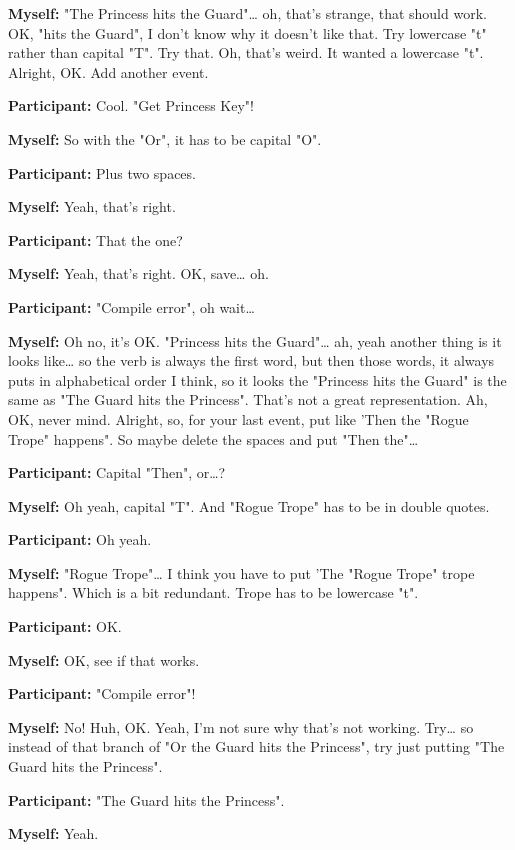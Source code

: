 \documentclass[11pt]{report}
\newcommand{\llabel}[1]{\hypertarget{llineno:#1}{\linelabel{#1}}}
\begin{document}
\begin{linenumbers}
\textbf{Myself:} "The Princess hits the Guard"\ldots{} oh, that's strange, that should work. OK, "hits the Guard", I don't know why it doesn't like that. Try lowercase "t" rather than capital "T". Try that. Oh, that's weird. It wanted a lowercase "t". Alright, OK. Add another event.

\textbf{Participant:} Cool. "Get Princess Key"!

\textbf{Myself:} So with the "Or", it has to be capital "O".

\textbf{Participant:} Plus two spaces.

\textbf{Myself:} Yeah, that's right.

\textbf{Participant:} That the one?

\textbf{Myself:} Yeah, that's right. OK, save\ldots{} oh.

\textbf{Participant:} "Compile error", oh wait\ldots{}

\textbf{Myself:} Oh no, it's OK. "Princess hits the Guard"\ldots{} ah, yeah another thing is it looks like\ldots{} so the verb is always the first word, but then those words, it always puts in alphabetical order I think, so it looks the "Princess hits the Guard" is the same as "The Guard hits the Princess". That's not a great representation. Ah, OK, never mind. Alright, so, for your last event, put like 'Then the "Rogue Trope" happens". So maybe delete the spaces and put "Then the"\ldots{}

\textbf{Participant:} Capital "Then", or\ldots{}?\llabel{lne:syntax5c4}

\textbf{Myself:} Oh yeah, capital "T". And "Rogue Trope" has to be in double quotes.

\textbf{Participant:} Oh yeah.

\textbf{Myself:} "Rogue Trope"\ldots{} I think you have to put 'The "Rogue Trope" trope happens". Which is a bit redundant. Trope has to be lowercase "t".

\textbf{Participant:} OK.

\textbf{Myself:} OK, see if that works.

\textbf{Participant:} "Compile error"!

\textbf{Myself:} No! Huh, OK. Yeah, I'm not sure why that's not working. Try\ldots{} so instead of that branch of "Or the Guard hits the Princess", try just putting "The Guard hits the Princess".

\textbf{Participant:} "The Guard hits the Princess".

\textbf{Myself:} Yeah.


\end{linenumbers}
\end{document}
